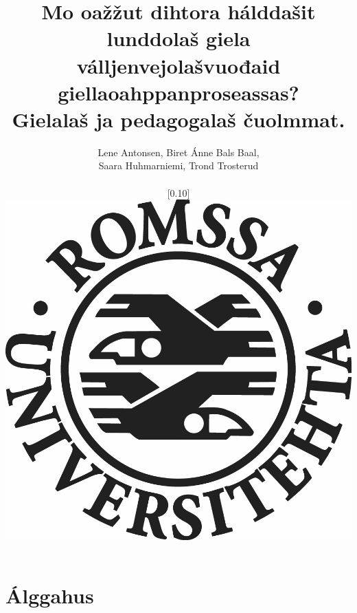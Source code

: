 \documentclass{article}
\begin{document}
\title{Mo oažžut dihtora hálddašit lunddolaš giela válljenvejolašvuođaid giellaoahppanproseassas? \\ Gielalaš ja pedagogalaš čuolmmat.}   
\author{Lene Antonsen, Biret Ánne Bals Baal, \\ Saara Huhmarniemi, Trond Trosterud \\ \begin{figure}  \scalebox{0.10}[0.10]{\includegraphics{img/LogoSamisk}} \end{figure}} 
\date{} 


\frame{\titlepage} 


\section{Álggahus}
\end{document}
